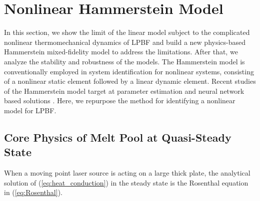 \documentclass [11pt, proquest] {uwthesis}[2020/02/24]
\begin{document}
\section{\label{sec:HAMMERSTEIN-MODEL-IN}Nonlinear Hammerstein Model}

In this section, we show the limit of the linear model subject to
the complicated nonlinear thermomechanical dynamics of LPBF and build
a new physics-based Hammerstein mixed-fidelity model to address the limitations.
After that, we analyze the stability and robustness of the models.
The Hammerstein model is conventionally employed in system identification
for nonlinear systems, consisting of a nonlinear static element followed
by a linear dynamic element. Recent studies of the Hammerstein model
target at parameter estimation and neural network based solutions
\cite{rayouf2019new,doyle2002identification,ren2011identification}. Here, we repurpose the method for identifying a nonlinear model for LPBF.

\subsection{\label{subsec:Analytical-Solutions}Core Physics of Melt Pool at
Quasi-Steady State}

When a moving point laser source is acting on a large thick plate,
the analytical solution of (\ref{eq:heat_conduction}) in the steady
state is the Rosenthal equation in (\ref{eq:Rosenthal}).
\end{document}
